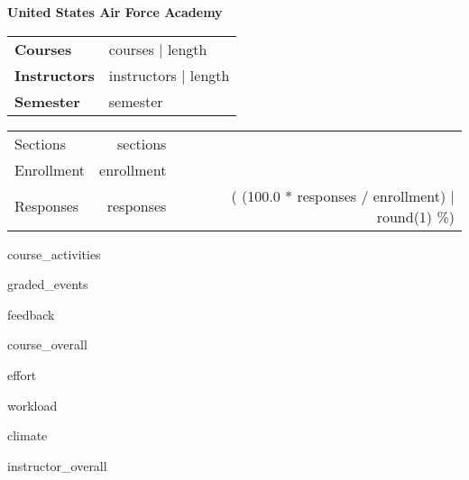 \documentclass{article}
\begin{document}
{\bfseries\large United States Air Force Academy}

\smallskip  %
\begin{minipage}{0.67\linewidth}
  \begin{tabular}{@{}>{\bfseries}ll}
    Courses & {{ courses | length }}\\
    Instructors & {{ instructors | length }}\\
    Semester & {{ semester }}\\
  \end{tabular}
\end{minipage}%
\begin{minipage}{0.33\linewidth}
  \hfill  %
  \begin{tabular}{l rr@{}}
    Sections & {{ sections }}\\
    Enrollment & {{ enrollment }}\\
    Responses & {{ responses }} & ({{ (100.0 * responses / enrollment) | round(1) }}\%)\\
  \end{tabular}
\end{minipage}
\medskip  %

{{ course_activities }}

\clearpage  %
{{ graded_events }}

\clearpage  %
{{ feedback }}

\clearpage  %
{{ course_overall }}

\clearpage  %
{{ effort }}

\clearpage  %
{{ workload }}

\clearpage  %
{{ climate }}

\clearpage  %
{{ instructor_overall }}

\clearpage  %
\end{document}
